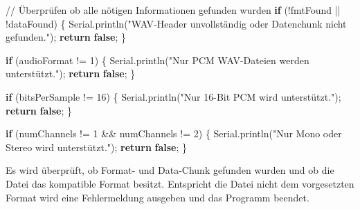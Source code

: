 \documentclass[
  ngerman,
  letterpaper,
  DIV=11]{scrreprt}
\newenvironment{Shaded}{\begin{snugshade}}{\end{snugshade}}
\newcommand{\CommentTok}[1]{\textcolor[rgb]{0.37,0.37,0.37}{#1}}
\newcommand{\ControlFlowTok}[1]{\textcolor[rgb]{0.00,0.23,0.31}{\textbf{#1}}}
\newcommand{\DecValTok}[1]{\textcolor[rgb]{0.68,0.00,0.00}{#1}}
\newcommand{\KeywordTok}[1]{\textcolor[rgb]{0.00,0.23,0.31}{\textbf{#1}}}
\newcommand{\NormalTok}[1]{\textcolor[rgb]{0.00,0.23,0.31}{#1}}
\newcommand{\OperatorTok}[1]{\textcolor[rgb]{0.37,0.37,0.37}{#1}}
\newcommand{\StringTok}[1]{\textcolor[rgb]{0.13,0.47,0.30}{#1}}
\begin{document}
\begin{Shaded}
\begin{Highlighting}[]
\CommentTok{// Überprüfen ob alle nötigen Informationen gefunden wurden}
\ControlFlowTok{if} \OperatorTok{(!}\NormalTok{fmtFound }\OperatorTok{||} \OperatorTok{!}\NormalTok{dataFound}\OperatorTok{)} \OperatorTok{\{}
\NormalTok{  Serial}\OperatorTok{.}\NormalTok{println}\OperatorTok{(}\StringTok{"WAV{-}Header unvollständig oder Datenchunk nicht gefunden."}\OperatorTok{);}
  \ControlFlowTok{return} \KeywordTok{false}\OperatorTok{;}
\OperatorTok{\}}

\ControlFlowTok{if} \OperatorTok{(}\NormalTok{audioFormat }\OperatorTok{!=} \DecValTok{1}\OperatorTok{)} \OperatorTok{\{}
\NormalTok{  Serial}\OperatorTok{.}\NormalTok{println}\OperatorTok{(}\StringTok{"Nur PCM WAV{-}Dateien werden unterstützt."}\OperatorTok{);}
  \ControlFlowTok{return} \KeywordTok{false}\OperatorTok{;}
\OperatorTok{\}}

\ControlFlowTok{if} \OperatorTok{(}\NormalTok{bitsPerSample }\OperatorTok{!=} \DecValTok{16}\OperatorTok{)} \OperatorTok{\{}
\NormalTok{  Serial}\OperatorTok{.}\NormalTok{println}\OperatorTok{(}\StringTok{"Nur 16{-}Bit PCM wird unterstützt."}\OperatorTok{);}
  \ControlFlowTok{return} \KeywordTok{false}\OperatorTok{;}
\OperatorTok{\}}

\ControlFlowTok{if} \OperatorTok{(}\NormalTok{numChannels }\OperatorTok{!=} \DecValTok{1} \OperatorTok{\&\&}\NormalTok{ numChannels }\OperatorTok{!=} \DecValTok{2}\OperatorTok{)} \OperatorTok{\{}
\NormalTok{  Serial}\OperatorTok{.}\NormalTok{println}\OperatorTok{(}\StringTok{"Nur Mono oder Stereo wird unterstützt."}\OperatorTok{);}
  \ControlFlowTok{return} \KeywordTok{false}\OperatorTok{;}
\OperatorTok{\}}
\end{Highlighting}
\end{Shaded}

Es wird überprüft, ob Format- und Data-Chunk gefunden wurden und ob die
Datei das kompatible Format besitzt. Entspricht die Datei nicht dem
vorgesetzten Format wird eine Fehlermeldung ausgeben und das Programm
beendet.
\end{document}
